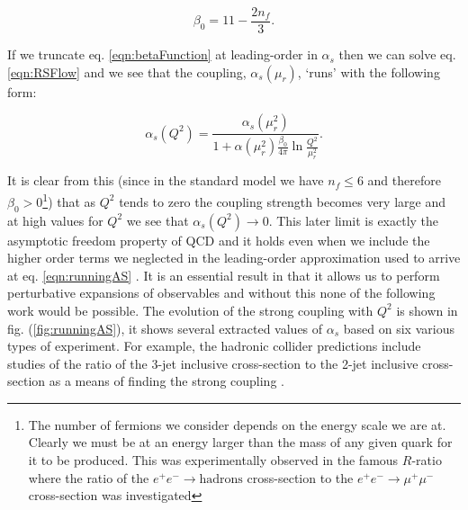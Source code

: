 	\begin{equation}
		\beta_0 = 11 - \frac{2n_f}{3}.
	\end{equation}

	If we truncate eq. \eqref{eqn:betaFunction} at leading-order in $\alpha_s$ then we can solve eq. \eqref{eqn:RSFlow}
	and we see that the coupling, $\alpha_s(\mu_r)$, `runs' with the following form:

	\begin{equation}
		\alpha_s(Q^2) = \frac{\alpha_s(\mu_r^2)}{1 + \alpha(\mu_r^2)\frac{\beta_0}{4\pi}\ln\frac{Q^2}{\mu_r^2}}.
		\label{eqn:runningAS}
	\end{equation}

	It is clear from this (since in the standard model we have $n_f\leq6$ and therefore $\beta_0>0$\footnote{The number of
	fermions we consider depends on the energy scale we are at. Clearly we must be at an energy larger than the mass of any
	given quark for it to be produced.  This was experimentally observed in the famous $R$-ratio where the ratio of the
	$e^+e^-\rightarrow \text{hadrons}$ cross-section to the $e^+e^-\rightarrow\mu^+\mu^-$ cross-section was investigated})
	that as $Q^2$ tends to zero the coupling strength becomes very large and at high values for $Q^2$ we see that $\alpha_s(Q^2)\rightarrow0$.
	This later limit is exactly the asymptotic freedom property of QCD and it holds even when we include the higher order
	terms we neglected in the leading-order approximation used to arrive at eq. \eqref{eqn:runningAS} \cite{Beringer:1900zz}.
	It is an essential result in that it allows us to perform perturbative expansions of observables and without this none of the
	following work would be possible.  The evolution of the strong coupling with $Q^2$ is shown in fig. (\ref{fig:runningAS}),
	it shows several extracted values of $\alpha_s$ based on six various types of experiment.  For example, the hadronic
	collider predictions include studies of the ratio of the 3-jet inclusive cross-section to the 2-jet inclusive
	cross-section as a means of finding the strong coupling \cite{Chatrchyan:2013txa}.


